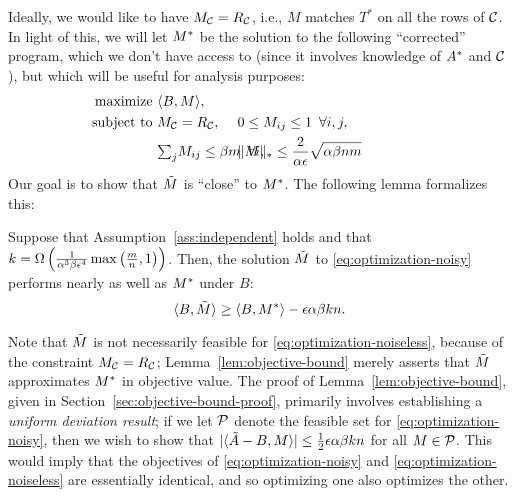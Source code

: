 Ideally, we would like to have $M_{\mathcal{C}} = R_{\mathcal{C}}$, i.e., $M$ matches $T^*$ on 
all the rows of $\mathcal{C}$. In light of this, 
we will let $M^*$ be the solution to the following ``corrected'' program, which 
we don't have access to (since it involves knowledge of $A^*$ and $\mathcal{C}$), 
but which will be useful for analysis purposes:
\begin{align}
\label{eq:optimization-noiseless}
\text{maximize } &\langle \Aa, M \rangle, \\
\notag \text{ subject to } &M_{\good} = R_{\good}, 
  &&\hskip-0.4in 0 \leq M_{ij} \leq 1 \,\,\, \forall i,j,  \\
\notag  &{\textstyle \sum_j} M_{ij} \leq \beta m \,\,\, \forall i, 
  &&\hskip-0.4in \|M\|_* \leq \frac{2}{\alpha\epsilon}\sqrt{\alpha\beta nm} \phantom{xxxxxxx}
\end{align}
Our goal is to show that $\tilde{M}$ is ``close'' to $M^*$. 
The following lemma formalizes this:
\begin{lemma}
\label{lem:objective-bound}
Suppose that Assumption~\ref{ass:independent} holds and that 
$k = \Omega\left( \frac{1}{\alpha^3\beta\epsilon^4}\max\left( \frac{m}{n},1 \right) \right)$. 
Then, the solution $\tilde{M}$ to \eqref{eq:optimization-noisy} performs nearly as 
well as $M^*$ under $B$:
\begin{equation}
\label{eq:objective-bound}
\langle B, \tilde{M} \rangle \geq \langle B, M^* \rangle - \epsilon \alpha\beta kn.
\end{equation}
\end{lemma}
Note that $\tilde{M}$ is not necessarily feasible for \eqref{eq:optimization-noiseless}, 
because of the constraint $M_{\mathcal{C}} = R_{\mathcal{C}}$; Lemma~\ref{lem:objective-bound} 
merely asserts that $\tilde{M}$ approximates $M^*$ in objective value. The proof of 
Lemma~\ref{lem:objective-bound}, given in Section~\ref{sec:objective-bound-proof}, 
primarily involves establishing a 
\emph{uniform deviation result}; if we let $\mathcal{P}$ denote the feasible set for 
\eqref{eq:optimization-noisy}, then we wish to show that 
$|\langle \tilde{A} - B, M \rangle| \leq \frac{1}{2}\epsilon \alpha\beta kn$ for all 
$M \in \mathcal{P}$. This would imply that the objectives of 
\eqref{eq:optimization-noisy} and \eqref{eq:optimization-noiseless} are 
essentially identical, and so optimizing one also optimizes the other.

